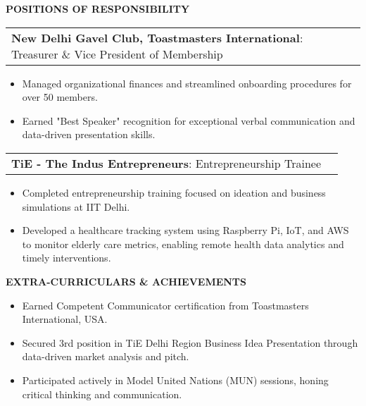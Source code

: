 \documentclass[a4paper]{article}
\begin{document}
\begin{sectionbox}\textbf{POSITIONS OF RESPONSIBILITY}\end{sectionbox}
\vspace{0em}
\begin{tabularx}{\textwidth}{@{}X r@{}}
    \textbf{New Delhi Gavel Club, Toastmasters International}: Treasurer \& Vice President of Membership & \\
\end{tabularx}
\begin{itemize}
    \item Managed organizational finances and streamlined onboarding procedures for over 50 members.
    \item Earned "Best Speaker" recognition for exceptional verbal communication and data-driven presentation skills.
\end{itemize}

\vspace{0.3em}
\begin{tabularx}{\textwidth}{@{}X r@{}}
    \textbf{TiE - The Indus Entrepreneurs}: Entrepreneurship Trainee & \\
\end{tabularx}
\begin{itemize}
    \item Completed entrepreneurship training focused on ideation and business simulations at IIT Delhi.
    \item Developed a healthcare tracking system using Raspberry Pi, IoT, and AWS to monitor elderly care metrics, enabling remote health data analytics and timely interventions.
\end{itemize}

\begin{sectionbox}\textbf{EXTRA-CURRICULARS \& ACHIEVEMENTS}\end{sectionbox}
\vspace{0em}
\begin{itemize}
    \item Earned Competent Communicator certification from Toastmasters International, USA.
    \item Secured 3rd position in TiE Delhi Region Business Idea Presentation through data-driven market analysis and pitch.
    \item Participated actively in Model United Nations (MUN) sessions, honing critical thinking and communication.
\end{itemize}
\end{document}
